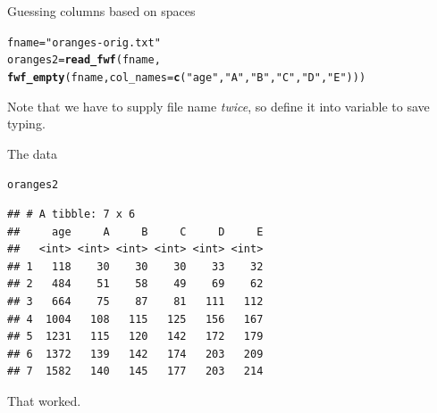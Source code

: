 \documentclass[unknownkeysallowed]{beamer}\usepackage[]{graphicx}\usepackage[]{color}
\makeatletter
\newcommand{\hlstr}[1]{\textcolor[rgb]{0.192,0.494,0.8}{#1}}%
\newcommand{\hlstd}[1]{\textcolor[rgb]{0.345,0.345,0.345}{#1}}%
\newcommand{\hlkwb}[1]{\textcolor[rgb]{0.69,0.353,0.396}{#1}}%
\newcommand{\hlkwc}[1]{\textcolor[rgb]{0.333,0.667,0.333}{#1}}%
\newcommand{\hlkwd}[1]{\textcolor[rgb]{0.737,0.353,0.396}{\textbf{#1}}}%
\newenvironment{kframe}{%
 \def\at@end@of@kframe{}%
 \ifinner\ifhmode%
  \def\at@end@of@kframe{\end{minipage}}%
  \begin{minipage}{\columnwidth}%
 \fi\fi%
 \def\FrameCommand##1{\hskip\@totalleftmargin \hskip-\fboxsep
 \colorbox{shadecolor}{##1}\hskip-\fboxsep
     \hskip-\linewidth \hskip-\@totalleftmargin \hskip\columnwidth}%
 \MakeFramed {\advance\hsize-\width
   \@totalleftmargin\z@ \linewidth\hsize
   \@setminipage}}%
 {\par\unskip\endMakeFramed%
 \at@end@of@kframe}
\newenvironment{knitrout}{}{} %
\makeatother
\begin{document}
\begin{frame}[fragile]{Guessing columns based on spaces}
  
\begin{knitrout}
\color{fgcolor}\begin{kframe}
\begin{alltt}
\hlstd{fname}\hlkwb{=}\hlstr{"oranges-orig.txt"}
\hlstd{oranges2}\hlkwb{=}\hlkwd{read_fwf}\hlstd{(fname,}
  \hlkwd{fwf_empty}\hlstd{(fname,}\hlkwc{col_names}\hlstd{=}\hlkwd{c}\hlstd{(}\hlstr{"age"}\hlstd{,}\hlstr{"A"}\hlstd{,}\hlstr{"B"}\hlstd{,}\hlstr{"C"}\hlstd{,}\hlstr{"D"}\hlstd{,}\hlstr{"E"}\hlstd{)))}
\end{alltt}


{\ttfamily\noindent\itshape\color{messagecolor}{\#\# Parsed with column specification:\\\#\# cols(\\\#\#\ \  age = col\_integer(),\\\#\#\ \  A = col\_integer(),\\\#\#\ \  B = col\_integer(),\\\#\#\ \  C = col\_integer(),\\\#\#\ \  D = col\_integer(),\\\#\#\ \  E = col\_integer()\\\#\# )}}\end{kframe}
\end{knitrout}

Note that we have to supply file name \emph{twice}, so define it into
variable to save typing.
  
\end{frame}

\begin{frame}[fragile]{The data}
  
\begin{knitrout}
\color{fgcolor}\begin{kframe}
\begin{alltt}
\hlstd{oranges2}
\end{alltt}
\begin{verbatim}
## # A tibble: 7 x 6
##     age     A     B     C     D     E
##   <int> <int> <int> <int> <int> <int>
## 1   118    30    30    30    33    32
## 2   484    51    58    49    69    62
## 3   664    75    87    81   111   112
## 4  1004   108   115   125   156   167
## 5  1231   115   120   142   172   179
## 6  1372   139   142   174   203   209
## 7  1582   140   145   177   203   214
\end{verbatim}
\end{kframe}
\end{knitrout}

That worked.
  
\end{frame}
\end{document}
